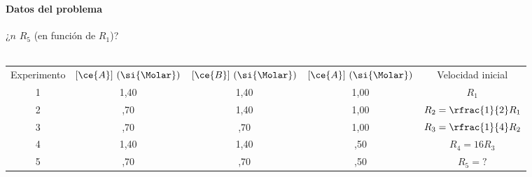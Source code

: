 
\begin{frame}
	\frametitle{\ejerciciocmd}
	\framesubtitle{Datos del problema}
	\begin{center}
		{\Large ¿$n$ $R_5$ (en función de $R_1$)?}\\[.3cm]
		\quad{}\\[.3cm]
		\begin{tabular}{SSSSc}
			{Experimento} & {$[\ce{A}]~(\si{\Molar})$} & {$[\ce{B}]~(\si{\Molar})$} & {$[\ce{A}]~(\si{\Molar})$} & {Velocidad inicial}   \\
			1		  & 		1,40			   &		1,40				& 			1,00			 & 		$R_1$            \\
			2 		  & 		 ,70			   & 		1,40				& 			1,00			 & $R_2=\rfrac{1}{2} R_1$\\
			3		  &			 ,70			   &		 ,70				& 			1,00			 & $R_3=\rfrac{1}{4} R_2$\\
			4		  &			1,40			   & 		1,40				& 			 ,50			 & $R_4 = 16 R_3$		 \\
			5		  & 		 ,70			   &		 ,70				& 			 ,50			 & $R_5=?$				 \\
		\end{tabular}
	\end{center}
\end{frame}

